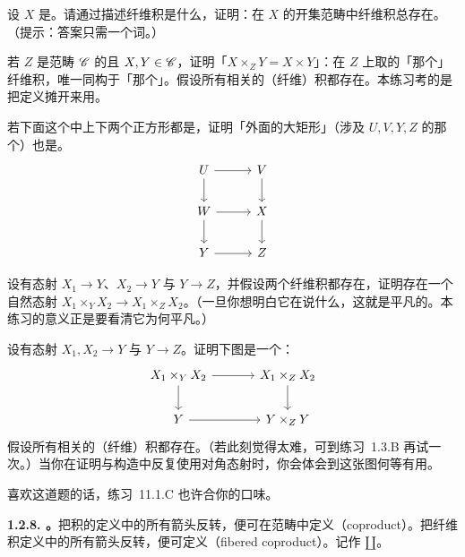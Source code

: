 \begin{exercise}\label{ex:fiber-products-of-open-sets}
设 $X$ 是\trTopologicalSpace。请通过描述纤维积是什么，证明：在 $X$ 的开集范畴中纤维积总存在。（提示：答案只需一个词。）
\end{exercise}

\begin{exercise}\label{ex:fiber-product-over-final-object}
若 $Z$ 是范畴 $\mathscr{C}$ 的\trFinalObject{}且 $X,Y\in\mathscr{C}$，证明「$X\times_Z Y=X\times Y$」：在 $Z$ 上取的「那个」纤维积，唯一同构于「那个」\trProduct。假设所有相关的（纤维）积都存在。本练习考的是把定义摊开来用。
\end{exercise}

\begin{exercise}\label{ex:pasting-cartesian-squares}
若下面这个\trCommutativeDiagram{}中上下两个正方形都是\trCartesianDiagram，证明「外面的大矩形」（涉及 $U,V,Y,Z$ 的那个）也是\trCartesianDiagram。
\[
\begin{tikzcd}[row sep=1.9em, column sep=2.8em]
U \ar[r] \ar[d] & V \ar[d] \\
W \ar[r] \ar[d] & X \ar[d] \\
Y \ar[r] & Z
\end{tikzcd}
\]
\end{exercise}

\begin{exercise}\label{ex:natural-map-fiber-products}
设有态射 $X_1\to Y$、$X_2\to Y$ 与 $Y\to Z$，并假设两个纤维积都存在，证明存在一个自然态射 $X_1\times_Y X_2\to X_1\times_Z X_2$。（一旦你想明白它在说什么，这就是平凡的。本练习的意义正是要看清它为何平凡。）
\end{exercise}

\begin{exercise}\label{ex:diagonal-base-change-square}
设有态射 $X_1,X_2\to Y$ 与 $Y\to Z$。证明下图是一个\trCartesianDiagram：
\[
\begin{tikzcd}[row sep=2em, column sep=3.4em]
X_1\times_Y X_2 \ar[r] \ar[d] & X_1\times_Z X_2 \ar[d] \\
Y \ar[r] & Y\times_Z Y
\end{tikzcd}
\]
假设所有相关的（纤维）积都存在。（若此刻觉得太难，可到练习~1.3.B 再试一次。）当你在证明与构造中反复使用对角态射时，你会体会到这张图何等有用。
\end{exercise}

喜欢这道题的话，练习~11.1.C 也许合你的口味。

\textbf{1.2.8. \trCoproduct。}\quad 把积的定义中的所有箭头反转，便可在范畴中定义\textbf{\trCoproduct}（coproduct）。把纤维积定义中的所有箭头反转，便可定义\textbf{\trFiberedCoproduct}（fibered coproduct）。\trCoproduct{}记作 $\amalg$。

